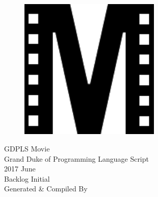 \documentclass[a4paper]{article}
\begin{document}
  \thispagestyle{empty}
  \begin{center}
    \bfseries
    \nbvspace[2]
    \begin{figure}[H]
      \centering
      \includegraphics[width=0.6\textwidth]{../logo.pdf}
    \end{figure}
    {\Huge GDPLS Movie} \\[10pt]
    {\LARGE\akaDora Grand Duke of Programming Language Script}\\[10pt]
    {\Huge 2017 June} \\
    \nbvspace[1]
    \Huge Backlog Initial\\
    \nbvspace[1]
    \normalsize Generated \& Compiled By \XeLaTeX
    \nbvspace[3]
  \end{center}
  \newpage
\end{document}

